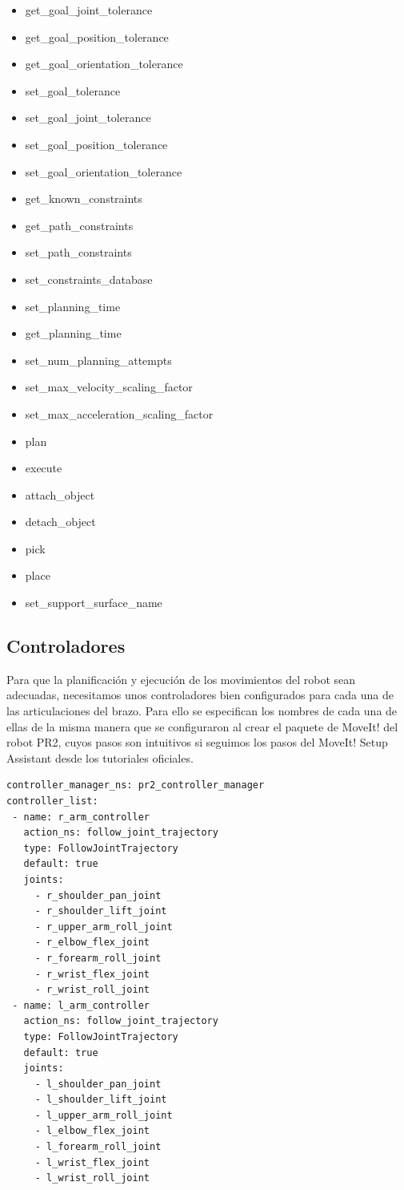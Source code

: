 \documentclass[12pt,spanish,chapterprefix, numbers=noenddot]{book}
\numberwithin{equation}{section}
\numberwithin{figure}{section}
\begin{document}
\begin{itemize}
\item get\_goal\_joint\_tolerance
\item get\_goal\_position\_tolerance
\item get\_goal\_orientation\_tolerance
\item set\_goal\_tolerance
\item set\_goal\_joint\_tolerance
\item set\_goal\_position\_tolerance
\item set\_goal\_orientation\_tolerance
\item get\_known\_constraints
\item get\_path\_constraints
\item set\_path\_constraints
\item set\_constraints\_database
\item set\_planning\_time
\item get\_planning\_time
\item set\_num\_planning\_attempts
\item set\_max\_velocity\_scaling\_factor
\item set\_max\_acceleration\_scaling\_factor
\item plan
\item execute
\item attach\_object
\item detach\_object
\item pick
\item place
\item set\_support\_surface\_name
\end{itemize}

\subsection{Controladores}
Para que la planificación y ejecución de los movimientos del robot sean adecuadas, necesitamos unos controladores bien configurados para cada una de las articulaciones del brazo. \cite{pr2_controllers}
Para ello se especifican los nombres de cada una de ellas de la misma manera que se configuraron al crear el paquete de MoveIt! del robot PR2, cuyos pasos son intuitivos si seguimos los pasos del MoveIt! Setup Assistant desde los tutoriales oficiales. \cite{moveit_tutorials}
\vspace{20pt}
	\begin{lstlisting}[frame=single] 
controller_manager_ns: pr2_controller_manager
controller_list:
 - name: r_arm_controller
   action_ns: follow_joint_trajectory
   type: FollowJointTrajectory
   default: true
   joints:
     - r_shoulder_pan_joint
     - r_shoulder_lift_joint
     - r_upper_arm_roll_joint
     - r_elbow_flex_joint
     - r_forearm_roll_joint
     - r_wrist_flex_joint
     - r_wrist_roll_joint
 - name: l_arm_controller
   action_ns: follow_joint_trajectory
   type: FollowJointTrajectory
   default: true
   joints:
     - l_shoulder_pan_joint
     - l_shoulder_lift_joint
     - l_upper_arm_roll_joint
     - l_elbow_flex_joint
     - l_forearm_roll_joint
     - l_wrist_flex_joint
     - l_wrist_roll_joint
    \end{lstlisting}
\end{document}
